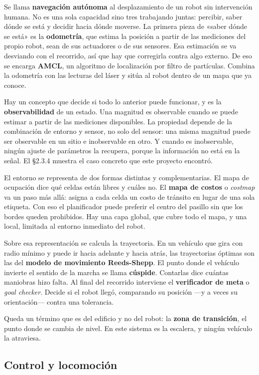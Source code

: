 Se llama \textbf{navegación autónoma} al desplazamiento de un robot sin
intervención humana. No es una sola capacidad sino tres trabajando juntas:
percibir, saber dónde se está y decidir hacia dónde moverse. La primera pieza de
«saber dónde se está» es la \textbf{odometría}, que estima la posición a partir
de las mediciones del propio robot, sean de sus actuadores o de sus sensores.
Esa estimación se va desviando con el recorrido, así que hay que corregirla
contra algo externo. De eso se encarga \textbf{AMCL}, un algoritmo de
localización por filtro de partículas. Combina la odometría con las lecturas del
láser y sitúa al robot dentro de un mapa que ya conoce.

Hay un concepto que decide si todo lo anterior puede funcionar, y es la
\textbf{observabilidad} de un estado. Una magnitud es observable cuando se puede
estimar a partir de las mediciones disponibles. La propiedad depende de la
combinación de entorno y sensor, no solo del sensor: una misma magnitud puede ser
observable en un sitio e inobservable en otro. Y cuando es inobservable, ningún
ajuste de parámetros la recupera, porque la información no está en la señal. El
§2.3.4 muestra el caso concreto que este proyecto encontró.

El entorno se representa de dos formas distintas y complementarias. El mapa de
ocupación dice qué celdas están libres y cuáles no. El \textbf{mapa de costos} o
\textit{costmap} va un paso más allá: asigna a cada celda un costo de tránsito en
lugar de una sola etiqueta. Con eso el planificador puede preferir el centro del
pasillo sin que los bordes queden prohibidos. Hay una capa global, que
cubre todo el mapa, y una local, limitada al entorno inmediato del robot.

Sobre esa representación se calcula la trayectoria. En un vehículo que gira con
radio mínimo y puede ir hacia adelante y hacia atrás, las trayectorias óptimas
son las del \textbf{modelo de movimiento Reeds-Shepp}. El punto donde el vehículo
invierte el sentido de la marcha se llama \textbf{cúspide}. Contarlas
dice cuántas maniobras hizo falta. Al final del recorrido interviene el
\textbf{verificador de meta} o \textit{goal checker}. Decide si el robot llegó,
comparando su posición —y a veces su orientación— contra una tolerancia.

Queda un término que es del edificio y no del robot: la \textbf{zona de
transición}, el punto donde se cambia de nivel. En este sistema es la escalera, y
ningún vehículo la atraviesa.

\subsection{Control y locomoción}


